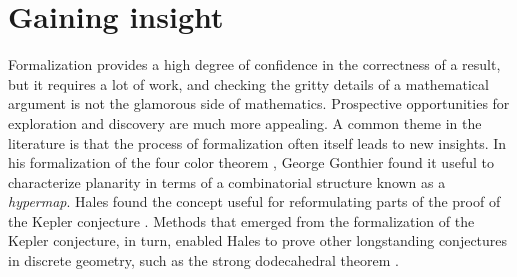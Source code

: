 \documentclass[12pt]{amsart}
\theoremstyle{definition}
\theoremstyle{remark}
\numberwithin{equation}{section}
\begin{document}
\section{Gaining insight}

Formalization provides a high degree of confidence in the correctness of a result, but it requires a lot of work, and checking the gritty details of a mathematical argument is not the glamorous side of mathematics. Prospective opportunities for exploration and discovery are much more appealing. A common theme in the literature is that the process of formalization often itself leads to new insights. In his formalization of the four color theorem \cite{gonthier:08}, George Gonthier found it useful to characterize planarity in terms of a combinatorial structure known as a \emph{hypermap}. Hales found the concept useful for reformulating parts of the proof of the Kepler conjecture \cite[Chapter 4]{hales:12}. Methods that emerged from the formalization of the Kepler conjecture, in turn, enabled Hales to prove other longstanding conjectures in discrete geometry, such as the strong dodecahedral theorem \cite[Section 8.6]{hales:12}.
\end{document}
